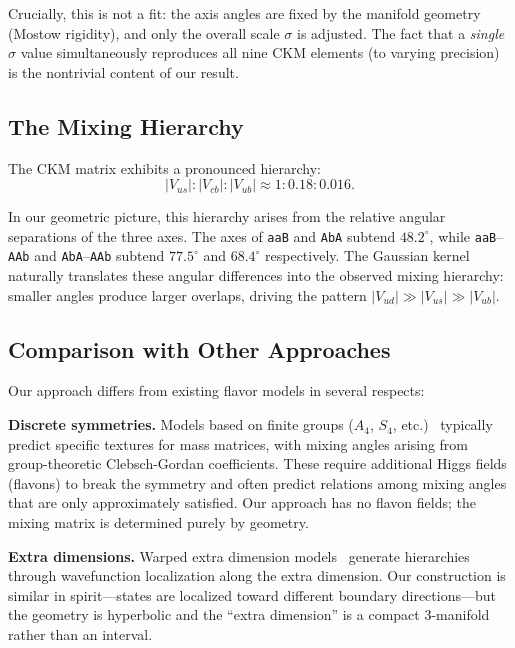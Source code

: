 \documentclass[11pt,a4paper]{article}
\begin{document}
Crucially, this is not a fit: the axis angles are fixed by the manifold 
geometry (Mostow rigidity), and only the overall scale $\sigma$ is 
adjusted. The fact that a \emph{single} $\sigma$ value simultaneously 
reproduces all nine CKM elements (to varying precision) is the 
nontrivial content of our result.

\subsection{The Mixing Hierarchy}
\label{subsec:hierarchy}

The CKM matrix exhibits a pronounced hierarchy:
\begin{equation}
|V_{us}| : |V_{cb}| : |V_{ub}| \approx 1 : 0.18 : 0.016.
\end{equation}

In our geometric picture, this hierarchy arises from the relative
angular separations of the three axes. The axes of \texttt{aaB} and
\texttt{AbA} subtend $48.2^\circ$, while \texttt{aaB}--\texttt{AAb}
and \texttt{AbA}--\texttt{AAb} subtend $77.5^\circ$ and $68.4^\circ$
respectively. The Gaussian kernel naturally translates these angular differences
into the observed mixing hierarchy: smaller angles produce larger
overlaps, driving the pattern $|V_{ud}| \gg |V_{us}| \gg |V_{ub}|$.



\subsection{Comparison with Other Approaches}
\label{subsec:comparison_other}

Our approach differs from existing flavor models in several respects:

\textbf{Discrete symmetries.} Models based on finite groups 
($A_4$, $S_4$, etc.)~\cite{AltarelliFeruglio2010} typically predict 
specific textures for mass matrices, with mixing angles arising from 
group-theoretic Clebsch-Gordan coefficients. These require additional 
Higgs fields (flavons) to break the symmetry and often predict 
relations among mixing angles that are only approximately satisfied. 
Our approach has no flavon fields; the mixing matrix is determined 
purely by geometry.

\textbf{Extra dimensions.} Warped extra dimension 
models~\cite{Randall1999} generate hierarchies through wavefunction 
localization along the extra dimension. Our construction is similar 
in spirit---states are localized toward different boundary 
directions---but the geometry is hyperbolic and the ``extra dimension'' 
is a compact 3-manifold rather than an interval.
\end{document}
